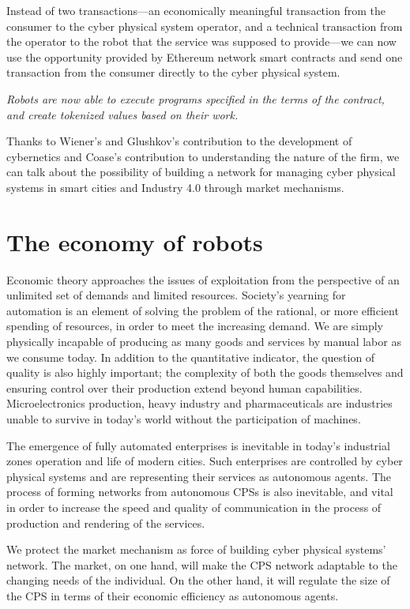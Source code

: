 \documentclass{article}
\begin{document}
Instead of two transactions—an economically meaningful transaction from the consumer to the cyber physical system operator, and a technical transaction from the operator to the robot that the service was supposed to provide—we can now use the opportunity provided by Ethereum network smart contracts and send one transaction from the consumer directly to the cyber physical system.

\textit{Robots are now able to execute programs specified in the terms of the contract, and create tokenized values based on their work.}

Thanks to Wiener's \cite{Wiener1961CyberneticsEd} and Glushkov's \cite{SergienkoIvan2014TopicalGlushkov} contribution to the development of cybernetics and Coase's \cite{Coase1937TheFirm} contribution to understanding the nature of the firm, we can talk about the possibility of building a network for managing cyber physical systems in smart cities and Industry 4.0 through market mechanisms.

\section{The economy of robots}

Economic theory approaches the issues of exploitation from the perspective of an unlimited set of demands and limited resources. Society's yearning for automation is an element of solving the problem of the rational, or more efficient spending of resources, in order to meet the increasing demand. We are simply physically incapable of producing as many goods and services by manual labor as we consume today. In addition to the quantitative indicator, the question of quality is also highly important; the complexity of both the goods themselves and ensuring control over their production extend beyond human capabilities. Microelectronics production, heavy industry and pharmaceuticals are industries unable to survive in today's world without the participation of machines.

The emergence of fully automated enterprises is inevitable in today's industrial zones operation and life of modern cities. Such enterprises are controlled by cyber physical systems and are representing their services as autonomous agents. The process of forming networks from autonomous CPSs is also inevitable, and vital in order to increase the speed and quality of communication in the process of production and rendering of the services.

We protect the market mechanism as force of building cyber physical systems' network. The market, on one hand, will make the CPS network adaptable to the changing needs of the individual. On the other hand, it will regulate the size of the CPS in terms of their economic efficiency as autonomous agents.
\end{document}
